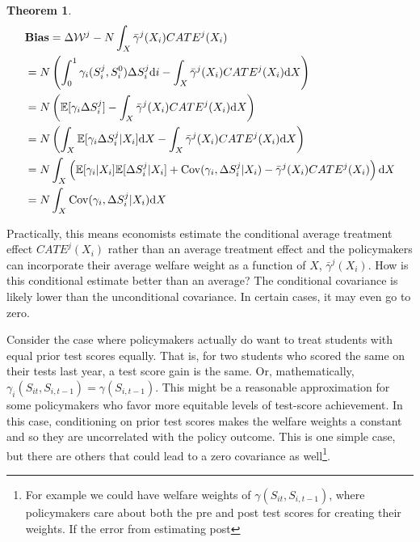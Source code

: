 \documentclass[12pt]{article}
\theoremstyle{definition}
\theoremstyle{definition}
\theoremstyle{definition}
\theoremstyle{definition}
\newtheorem{thm}{Theorem}
\begin{document}
    \begin{thm}
    \label{cond_exp_1}
        \begin{align*}
       & \textbf{Bias} = \Delta \mathcal{W}^j - N \int_X \bar{\gamma}^j(X_i) CATE^j(X_i) \\
       & =  N \left( \int_0^1 \gamma_i(S_i^j, S_i^0) \Delta S^j_i \text{d}i - \int_X \bar{\gamma}^j(X_i) CATE^j(X_i) \text{d}X \right)  \\
      & =  N \left( \mathbb{E}[\gamma_i \Delta S^j_i] - \int_X \bar{\gamma}^j(X_i) CATE^j(X_i) \text{d}X \right) \\
        & = N \left( \int_X \mathbb{E}[\gamma_i \Delta S^j_i| X_i]\text{d}X - \int_X \bar{\gamma}^j(X_i) CATE^j(X_i)\text{d}X \right)  \\
       & = N \int_X \left(  \mathbb{E}[\gamma_i| X_i] \mathbb{E}[\Delta S^j_i| X_i] + \mathrm{Cov}(\gamma_i, \Delta S^j_i| X_i) - \bar{\gamma}^j(X_i) CATE^j(X_i) \right)\text{d}X \\
       & = N \int_X \mathrm{Cov}(\gamma_i, \Delta S^j_i| X_i)\text{d}X
    \end{align*}
    \end{thm}
    
    Practically, this means economists estimate the conditional average treatment effect $ CATE^j(X_i)$ rather than an average treatment effect and the policymakers can incorporate their average welfare weight as a function of $X$,  $\bar{\gamma}^j(X_i)$.  How is this conditional estimate better than an average? The conditional covariance is likely lower than the unconditional covariance. In certain cases, it may even go to zero. 
    
    Consider the case where policymakers actually do want to treat students with equal prior test scores equally. That is, for two students who scored the same on their tests last year, a test score gain is the same. Or, mathematically, $\gamma_i(S_{it}, S_{i,t-1}) = \gamma(S_{i,t-1})$. This might be a reasonable approximation for some policymakers who favor more equitable levels of test-score achievement. In this case, conditioning on prior test scores makes the welfare weights a constant and so they are uncorrelated with the policy outcome. This is one simple case, but there are others that could lead to a zero covariance as well\footnote{For example we could have welfare weights of $\gamma(S_{it}, S_{i,t-1})$, where policymakers care about both the pre and post test scores for creating their weights. If the error from estimating post }.  
    
\end{document}

